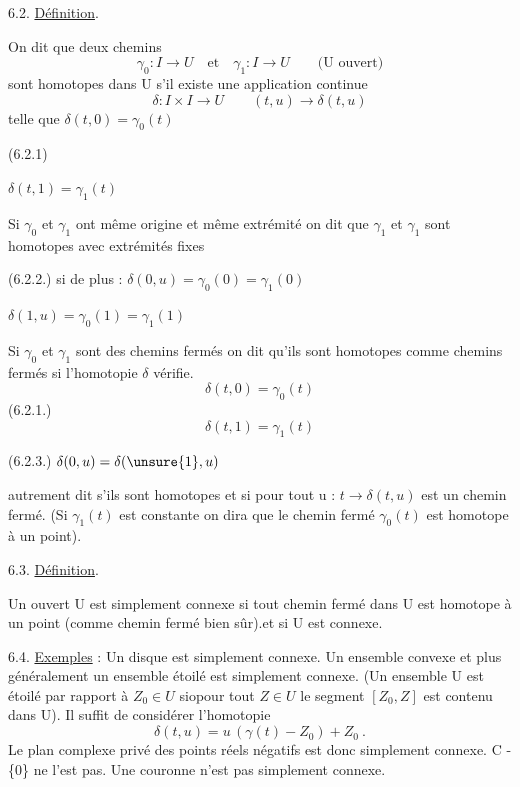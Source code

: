 
6.2. \uline{Définition}.

On dit que deux chemins
\[ \gamma_0 : I \to U \quad \text{et} \quad \gamma_1 : I \to U \qquad \text{(U ouvert)} \]
sont homotopes dans U s'il existe une application continue
\[ \delta : I \times I \to U \qquad (t,u) \to \delta(t,u) \]
telle que \qquad $\delta(t,0) = \gamma_0(t)$

(6.2.1)

\qquad\qquad $\delta(t,1) = \gamma_1(t)$

Si $\gamma_0$ et $\gamma_1$ ont même origine et même extrémité on dit que $\gamma_1$ et $\gamma_1$
sont homotopes avec extrémités fixes

(6.2.2.) \qquad si de plus : \qquad $\delta(0,u) = \gamma_0(0) = \gamma_1(0)$

\qquad\qquad $\delta(1,u) = \gamma_0(1) = \gamma_1(1)$

Si $\gamma_0$ et $\gamma_1$ sont des chemins fermés\unsure{,} on dit qu'ils sont homotopes comme
chemins fermés si l'homotopie $\delta$ vérifie.
\[ \delta(t,0) = \gamma_0(t) \]
(6.2.1.)
\[ \delta(t,1) = \gamma_1(t) \]

(6.2.3.) \qquad $\delta(0,u) = \delta(\unsure{1},u)$

autrement dit s'ils sont homotopes et si pour tout u : $t \to \delta(t,u)$ est un
chemin fermé. (Si $\gamma_1(t)$ est constante on dira que le chemin fermé $\gamma_0(t)$
est homotope à un point).

6.3. \uline{Définition}.

Un ouvert U est simplement connexe si tout chemin fermé dans U
est homotope à un point (comme chemin fermé bien sûr).et si U est connexe.

6.4. \uline{Exemples} : Un disque est simplement connexe. Un ensemble convexe et plus
généralement un ensemble étoilé est simplement connexe. (Un ensemble U est
étoilé par rapport à $Z_0 \in U$ siopour tout $Z \in U$ le segment $[Z_0,Z]$ est
contenu dans U). Il suffit de considérer l'homotopie
\[ \delta(t,u) = u\,(\gamma(t) - Z_0) + Z_0 \ . \]
Le plan complexe privé des points réels négatifs est donc simplement connexe.
C - \{0\} ne l'est pas. Une couronne n'est pas simplement connexe.


